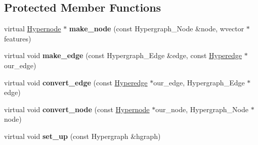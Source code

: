 \subsection*{Protected Member Functions}
\begin{DoxyCompactItemize}
\item 
\hypertarget{classScarab_1_1HG_1_1HypergraphImpl_af14198ba5fccb5d4118188fa42feb8ff}{
virtual \hyperlink{classScarab_1_1HG_1_1Hypernode}{Hypernode} $\ast$ {\bfseries make\_\-node} (const Hypergraph\_\-Node \&node, wvector $\ast$features)}
\label{classScarab_1_1HG_1_1HypergraphImpl_af14198ba5fccb5d4118188fa42feb8ff}

\item 
\hypertarget{classScarab_1_1HG_1_1HypergraphImpl_a238a7ce3b578c8126eccbc7803570638}{
virtual void {\bfseries make\_\-edge} (const Hypergraph\_\-Edge \&edge, const \hyperlink{classScarab_1_1HG_1_1Hyperedge}{Hyperedge} $\ast$our\_\-edge)}
\label{classScarab_1_1HG_1_1HypergraphImpl_a238a7ce3b578c8126eccbc7803570638}

\item 
\hypertarget{classScarab_1_1HG_1_1HypergraphImpl_a30349aca0e3b8f8dc72ed74d78e8c5b8}{
virtual void {\bfseries convert\_\-edge} (const \hyperlink{classScarab_1_1HG_1_1Hyperedge}{Hyperedge} $\ast$our\_\-edge, Hypergraph\_\-Edge $\ast$edge)}
\label{classScarab_1_1HG_1_1HypergraphImpl_a30349aca0e3b8f8dc72ed74d78e8c5b8}

\item 
\hypertarget{classScarab_1_1HG_1_1HypergraphImpl_a93e9e250fa457a2171bf07241b7829eb}{
virtual void {\bfseries convert\_\-node} (const \hyperlink{classScarab_1_1HG_1_1Hypernode}{Hypernode} $\ast$our\_\-node, Hypergraph\_\-Node $\ast$node)}
\label{classScarab_1_1HG_1_1HypergraphImpl_a93e9e250fa457a2171bf07241b7829eb}

\item 
\hypertarget{classScarab_1_1HG_1_1HypergraphImpl_ae91de73e633e450b01664e3ec964019c}{
virtual void {\bfseries set\_\-up} (const Hypergraph \&hgraph)}
\label{classScarab_1_1HG_1_1HypergraphImpl_ae91de73e633e450b01664e3ec964019c}

\end{DoxyCompactItemize}
